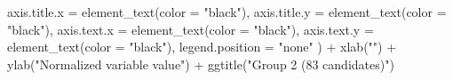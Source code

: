 \documentclass[
  11pt,
  oneside]{book}
\newenvironment{Shaded}{\begin{snugshade}}{\end{snugshade}}
\newcommand{\AttributeTok}[1]{\textcolor[rgb]{0.77,0.63,0.00}{#1}}
\newcommand{\FunctionTok}[1]{\textcolor[rgb]{0.00,0.00,0.00}{#1}}
\newcommand{\NormalTok}[1]{#1}
\newcommand{\SpecialCharTok}[1]{\textcolor[rgb]{0.00,0.00,0.00}{#1}}
\newcommand{\StringTok}[1]{\textcolor[rgb]{0.31,0.60,0.02}{#1}}
\begin{document}
\begin{Shaded}
\begin{Highlighting}[]
    \AttributeTok{axis.title.x =} \FunctionTok{element\_text}\NormalTok{(}\AttributeTok{color =} \StringTok{"black"}\NormalTok{),}
    \AttributeTok{axis.title.y =} \FunctionTok{element\_text}\NormalTok{(}\AttributeTok{color =} \StringTok{"black"}\NormalTok{),}
    \AttributeTok{axis.text.x =} \FunctionTok{element\_text}\NormalTok{(}\AttributeTok{color =} \StringTok{"black"}\NormalTok{),}
    \AttributeTok{axis.text.y =} \FunctionTok{element\_text}\NormalTok{(}\AttributeTok{color =} \StringTok{"black"}\NormalTok{),}
    \AttributeTok{legend.position =} \StringTok{"none"}
\NormalTok{  ) }\SpecialCharTok{+}
  \FunctionTok{xlab}\NormalTok{(}\StringTok{""}\NormalTok{) }\SpecialCharTok{+}
  \FunctionTok{ylab}\NormalTok{(}\StringTok{"Normalized variable value"}\NormalTok{) }\SpecialCharTok{+}
  \FunctionTok{ggtitle}\NormalTok{(}\StringTok{"Group 2 (83 candidates)"}\NormalTok{)}
\end{Highlighting}
\end{Shaded}
\end{document}
